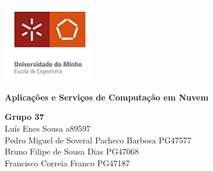 \documentclass[11pt]{article}
\begin{document}
\begin{titlepage}
    \begin{center}

	    \includegraphics[width=0.3\textwidth]{images/capa/EscolaEngenhariaUM.jpeg}
       
        \vspace{1cm}
       
        \textbf{\Large Aplicações e Serviços de Computação em Nuvem}
        \vspace{2cm}
        \par
        \Large \textbf{Grupo 37}\\
        \vspace{0.5cm}
        Luís Enes Sousa a89597\\
        Pedro Miguel de Soveral Pacheco Barbosa PG47577\\
        Bruno Filipe de Sousa Dias PG47068\\
        Francisco Correia Franco PG47187\\
        \vspace{1.5cm}
       

\end{center}
\end{titlepage}
\end{document}
